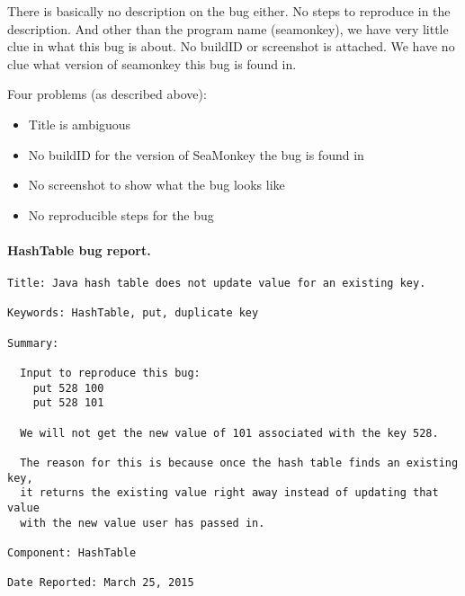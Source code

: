 \documentclass[12pt]{article}
\begin{document}
There is basically no description on the bug either. No steps to reproduce in the description. And other than the program name (seamonkey), we have very little clue in what this bug is about. No buildID or screenshot is attached. We have no clue what version of seamonkey this bug is found in.

Four problems (as described above):
\begin{itemize}
\item Title is ambiguous
\item No buildID for the version of SeaMonkey the bug is found in
\item No screenshot to show what the bug looks like
\item No reproducible steps for the bug
\end{itemize}

\paragraph{HashTable bug report.}

\begin{verbatim}
Title: Java hash table does not update value for an existing key.

Keywords: HashTable, put, duplicate key

Summary:

  Input to reproduce this bug:
    put 528 100
    put 528 101
    
  We will not get the new value of 101 associated with the key 528.
    
  The reason for this is because once the hash table finds an existing key,
  it returns the existing value right away instead of updating that value
  with the new value user has passed in.

Component: HashTable

Date Reported: March 25, 2015

\end{verbatim}
\end{document}
